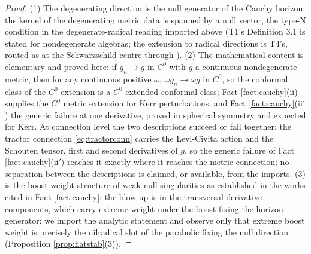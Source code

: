 \documentclass[11pt]{article}
\theoremstyle{definition}
\begin{document}
\begin{proof}
(1) The degenerating direction is the null generator of the Cauchy horizon; the kernel of the degenerating metric data is spanned by a null vector, the type-N condition in the degenerate-radical reading imported above (T1's Definition 3.1 is stated for nondegenerate algebras; the extension to radical directions is T4's, routed as at the Schwarzschild centre through \cite[Prop.~3.1]{ButlerT5}). (2) The mathematical content is elementary and proved here: if $g_n \to g$ in $C^0$ with $g$ a continuous nondegenerate metric, then for any continuous positive $\omega$, $\omega g_n \to \omega g$ in $C^0$, so the conformal class of the $C^0$ extension is a $C^0$-extended conformal class; Fact \ref{fact:cauchy}(ii) supplies the $C^0$ metric extension for Kerr perturbations, and Fact \ref{fact:cauchy}(ii$'$) the generic failure at one derivative, proved in spherical symmetry and expected for Kerr. At connection level the two descriptions succeed or fail together: the tractor connection \eqref{eq:tractorconn} carries the Levi-Civita action and the Schouten tensor, first and second derivatives of $g$, so the generic failure of Fact \ref{fact:cauchy}(ii$'$) reaches it exactly where it reaches the metric connection; no separation between the descriptions is claimed, or available, from the imports. (3) is the boost-weight structure of weak null singularities as established in the works cited in Fact \ref{fact:cauchy}: the blow-up is in the transversal derivative components, which carry extreme weight under the boost fixing the horizon generator; we import the analytic statement and observe only that extreme boost weight is precisely the nilradical slot of the parabolic fixing the null direction (Proposition \ref{prop:flatstab}(3)).
\end{proof}
\end{document}

